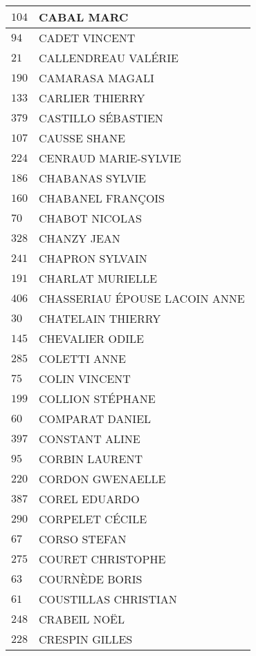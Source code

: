 \begin{xltabular}{\linewidth}{|l|X|}
    \hline
    $104$ & CABAL MARC \\
    \hline
    $94$ & CADET VINCENT \\
    \hline
    $21$ & CALLENDREAU VALÉRIE \\
    \hline
    $190$ & CAMARASA MAGALI \\
    \hline
    $133$ & CARLIER THIERRY \\
    \hline
    $379$ & CASTILLO SÉBASTIEN \\
    \hline
    $107$ & CAUSSE SHANE \\
    \hline
    $224$ & CENRAUD MARIE-SYLVIE \\
    \hline
    $186$ & CHABANAS SYLVIE \\
    \hline
    $160$ & CHABANEL FRANÇOIS \\
    \hline
    $70$ & CHABOT NICOLAS \\
    \hline
    $328$ & CHANZY JEAN \\
    \hline
    $241$ & CHAPRON SYLVAIN \\
    \hline
    $191$ & CHARLAT MURIELLE \\
    \hline
    $406$ & CHASSERIAU ÉPOUSE LACOIN ANNE \\
    \hline
    $30$ & CHATELAIN THIERRY \\
    \hline
    $145$ & CHEVALIER ODILE \\
    \hline
    $285$ & COLETTI ANNE \\
    \hline
    $75$ & COLIN VINCENT \\
    \hline
    $199$ & COLLION STÉPHANE \\
    \hline
    $60$ & COMPARAT DANIEL \\
    \hline
    $397$ & CONSTANT ALINE \\
    \hline
    $95$ & CORBIN LAURENT \\
    \hline
    $220$ & CORDON GWENAELLE \\
    \hline
    $387$ & COREL EDUARDO \\
    \hline
    $290$ & CORPELET CÉCILE \\
    \hline
    $67$ & CORSO STEFAN \\
    \hline
    $275$ & COURET CHRISTOPHE \\
    \hline
    $63$ & COURNÈDE BORIS \\
    \hline
    $61$ & COUSTILLAS CHRISTIAN \\
    \hline
    $248$ & CRABEIL NOËL \\
    \hline
    $228$ & CRESPIN GILLES \\

\end{xltabular}
